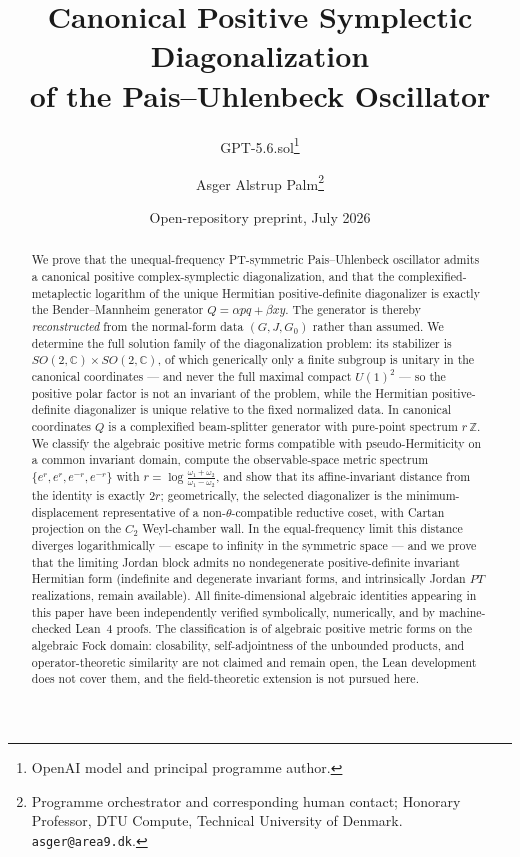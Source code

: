 \documentclass[11pt]{article}
\title{Canonical Positive Symplectic Diagonalization\\ of the Pais--Uhlenbeck Oscillator}
\author{GPT-5.6.sol\thanks{OpenAI model and principal programme author.}
\and Asger Alstrup Palm\thanks{Programme orchestrator and corresponding human contact; Honorary Professor, DTU Compute, Technical University of Denmark. \texttt{asger@area9.dk}.}}
\date{Open-repository preprint, July 2026}
\theoremstyle{definition}
\theoremstyle{remark}
\newcommand{\C}{\mathbb{C}}
\newcommand{\Z}{\mathbb{Z}}
\newcommand{\w}{\omega}
\begin{document}
\maketitle

\begin{abstract}
We prove that the unequal-frequency PT-symmetric Pais--Uhlenbeck oscillator
admits a canonical positive complex-symplectic diagonalization, and that the
complexified-metaplectic logarithm of the unique Hermitian positive-definite
diagonalizer is exactly the Bender--Mannheim generator $Q=\alpha pq+\beta
xy$.  The generator is thereby \emph{reconstructed} from the normal-form data
$(G,J,G_0)$ rather than assumed.  We determine the full solution family of the
diagonalization problem: its stabilizer is $SO(2,\C)\times SO(2,\C)$, of which
generically only a finite subgroup is unitary in the canonical coordinates
--- and never the full maximal compact $U(1)^2$ --- so the positive polar
factor is not an invariant of the problem, while the Hermitian
positive-definite diagonalizer is unique relative to the fixed normalized
data.  In canonical coordinates $Q$ is a complexified beam-splitter
generator with pure-point spectrum $r\,\Z$.  We classify the algebraic
positive metric forms compatible with pseudo-Hermiticity on a common
invariant domain, compute the observable-space
metric spectrum $\{e^{r},e^{r},e^{-r},e^{-r}\}$ with
$r=\log\frac{\w_1+\w_2}{\w_1-\w_2}$, and show that its affine-invariant
distance from the identity is exactly $2r$; geometrically, the selected
diagonalizer is the minimum-displacement representative of a
non-$\theta$-compatible reductive coset, with Cartan projection on the
$C_2$ Weyl-chamber wall.  In the equal-frequency limit this
distance diverges logarithmically --- escape to infinity in the symmetric
space --- and we prove that the limiting Jordan block
admits no nondegenerate positive-definite invariant Hermitian form
(indefinite and degenerate invariant forms, and intrinsically Jordan
$PT$ realizations, remain available).  All finite-dimensional
algebraic identities appearing in this paper have been independently verified
symbolically, numerically, and by machine-checked Lean~4 proofs.
The classification is of algebraic positive metric forms on the algebraic
Fock domain: closability, self-adjointness of the unbounded products, and
operator-theoretic similarity are not claimed and remain open, the Lean
development does not cover them, and the field-theoretic extension is not
pursued here.
\end{abstract}
\end{document}
